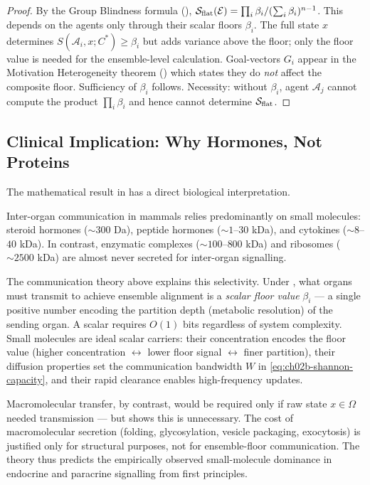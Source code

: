 \begin{proof}
By the Group Blindness formula (),
$\mathcal{S}_{\mathrm{flat}}(\mathcal{E}) = \prod_i \beta_i / (\sum_i \beta_i)^{n-1}$.
This depends on the agents only through their scalar floors $\beta_i$.
The full state $x$ determines $S(\mathcal{A}_i, x; C^*) \geq \beta_i$ but
adds variance above the floor; only the floor value is needed for the
ensemble-level calculation.  Goal-vectors $G_i$ appear in the Motivation
Heterogeneity theorem () which states they
do \emph{not} affect the composite floor.  Sufficiency of $\beta_i$ follows.
Necessity: without $\beta_i$, agent $\mathcal{A}_j$ cannot compute the
product $\prod_i \beta_i$ and hence cannot determine
$\mathcal{S}_{\mathrm{flat}}$.
\end{proof}

\subsection{Clinical Implication: Why Hormones, Not Proteins}

The mathematical result in  has a direct
biological interpretation.

\begin{remark}
\label{rem:ch02b-hormones}
Inter-organ communication in mammals relies predominantly on small molecules:
steroid hormones ($\sim 300$ Da), peptide hormones ($\sim 1$--$30$ kDa), and
cytokines ($\sim 8$--$40$ kDa).  In contrast, enzymatic complexes
($\sim 100$--$800$ kDa) and ribosomes ($\sim 2500$ kDa) are almost never
secreted for inter-organ signalling.

The communication theory above explains this selectivity.  Under
, what organs must transmit to achieve
ensemble alignment is a \emph{scalar floor value} $\beta_i$ — a single
positive number encoding the partition depth (metabolic resolution) of the
sending organ.  A scalar requires $O(1)$ bits regardless of system complexity.
Small molecules are ideal scalar carriers: their concentration encodes the
floor value (higher concentration $\leftrightarrow$ lower floor signal
$\leftrightarrow$ finer partition), their diffusion properties set the
communication bandwidth $W$ in \eqref{eq:ch02b-shannon-capacity}, and their
rapid clearance enables high-frequency updates.

Macromolecular transfer, by contrast, would be required only if raw state
$x \in \Omega$ needed transmission — but 
shows this is unnecessary.  The cost of macromolecular secretion (folding,
glycosylation, vesicle packaging, exocytosis) is justified only for structural
purposes, not for ensemble-floor communication.  The theory thus predicts the
empirically observed small-molecule dominance in endocrine and paracrine
signalling from first principles.
\end{remark}

